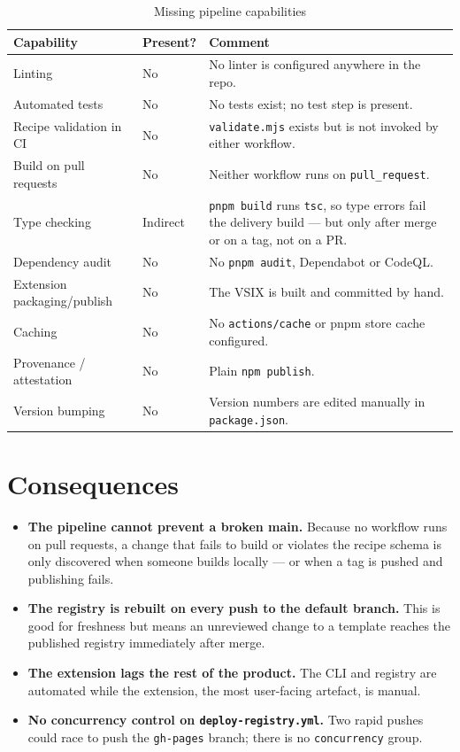 \begin{longtable}{p{4.6cm}p{2.2cm}p{7.4cm}}
\caption{Missing pipeline capabilities}\\
\toprule
\textbf{Capability} & \textbf{Present?} & \textbf{Comment} \\
\midrule

Linting & No & No linter is configured anywhere in the repo. \\
Automated tests & No & No tests exist; no test step is present. \\
Recipe validation in CI & No & \texttt{validate.mjs} exists but is not invoked by
either workflow. \\
Build on pull requests & No & Neither workflow runs on \texttt{pull\_request}. \\
Type checking & Indirect & \texttt{pnpm build} runs \texttt{tsc}, so type errors
fail the delivery build --- but only after merge or on a tag, not on a PR. \\
Dependency audit & No & No \texttt{pnpm audit}, Dependabot or CodeQL. \\
Extension packaging/publish & No & The VSIX is built and committed by hand. \\
Caching & No & No \texttt{actions/cache} or pnpm store cache configured. \\
Provenance / attestation & No & Plain \texttt{npm publish}. \\
Version bumping & No & Version numbers are edited manually in
\texttt{package.json}. \\
\bottomrule
\end{longtable}

\section{Consequences}

\begin{itemize}
  \item \textbf{The pipeline cannot prevent a broken main.} Because no workflow
        runs on pull requests, a change that fails to build or violates the
        recipe schema is only discovered when someone builds locally --- or when
        a tag is pushed and publishing fails.
  \item \textbf{The registry is rebuilt on every push to the default branch.}
        This is good for freshness but means an unreviewed change to a template
        reaches the published registry immediately after merge.
  \item \textbf{The extension lags the rest of the product.} The CLI and registry
        are automated while the extension, the most user-facing artefact, is
        manual.
  \item \textbf{No concurrency control on \texttt{deploy-registry.yml}.} Two rapid
        pushes could race to push the \texttt{gh-pages} branch; there is no
        \texttt{concurrency} group.
\end{itemize}


